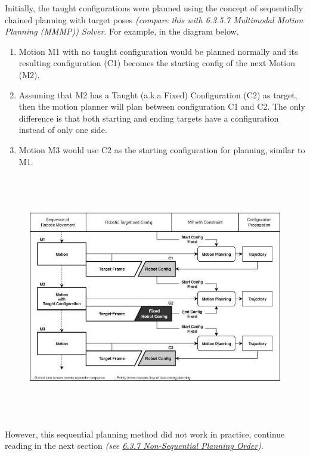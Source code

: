 \documentclass[11pt]{book}
\begin{document}
Initially, the taught configurations were planned using the concept of sequentially chained planning with target poses\textit{\textcolor[HTML]{B7B7B7}{ (compare this with 6.3.5.7 Multimodal Motion Planning (MMMP)) Solver}}. For example, in the diagram below,

\begin{enumerate}
	\item Motion M1 with no taught configuration would be planned normally and its resulting configuration (C1) becomes the starting config of the next Motion (M2). 

	\item Assuming that M2 has a Taught (a.k.a Fixed) Configuration (C2) as target, then the motion planner will plan between configuration C1 and C2. The only difference is that both starting and ending targets have a configuration instead of only one side.

	\item Motion M3 would use C2 as the starting configuration for planning, similar to M1.

\end{enumerate}
\begin{figure}[H]
\includegraphics[width=15.92cm,height=10.72cm]{./images/image60.jpeg}
\end{figure}


However, this sequential planning method did not work in practice, continue reading in the next section \textit{\textcolor[HTML]{B7B7B7}{(see \uline{6.3.7 Non-Sequential Planning Order})}}.
\end{document}
